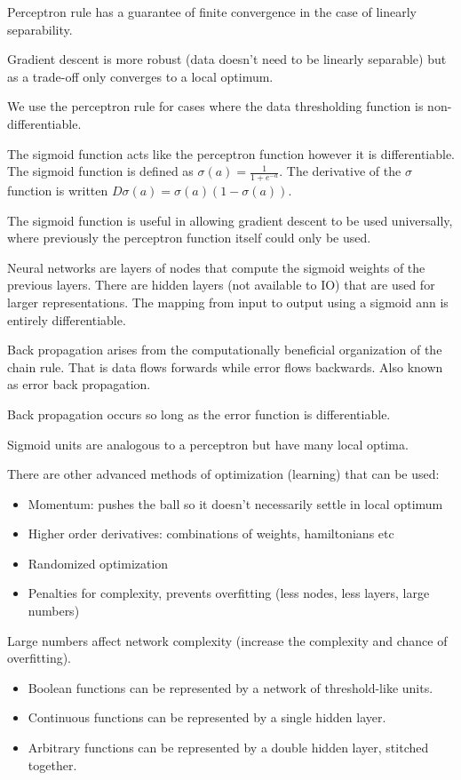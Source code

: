 \documentclass{article}
\begin{document}
Perceptron rule has a guarantee of finite convergence in the case of linearly 
separability. 

Gradient descent is more robust (data doesn't need to be linearly separable) but
as a trade-off only converges to a local optimum. 

We use the perceptron rule for cases where the data thresholding function is
non-differentiable.

The sigmoid function acts like the perceptron function however it is
differentiable. The sigmoid function is defined as $\sigma(a) = 
\frac{1}{1 + e^{-a}}$. The derivative of the $\sigma$ function is written
$D\sigma(a) = \sigma(a)(1 - \sigma(a))$. 

The sigmoid function is useful in allowing gradient descent to be used
universally, where previously the perceptron function itself could only be used. 

Neural networks are layers of nodes that compute the sigmoid weights of the
previous layers. There are hidden layers (not available to IO) that are used 
for larger representations.  The mapping from input to output using a sigmoid
ann is entirely differentiable. 

Back propagation arises from the computationally beneficial organization of the
chain rule. That is data flows forwards while error flows backwards. Also known
as error back propagation. 

Back propagation occurs so long as the error function is differentiable. 

Sigmoid units are analogous to a perceptron but have many local optima. 

There are other advanced methods of optimization (learning) that can be used:
\begin{itemize}
\item Momentum: pushes the ball so it doesn't necessarily settle in local
	optimum
\item Higher order derivatives: combinations of weights, hamiltonians etc
\item Randomized optimization
\item Penalties for complexity, prevents overfitting (less nodes, less layers,
	large numbers)
\end{itemize}

Large numbers affect network complexity (increase the complexity and chance of
overfitting).

\begin{itemize}
	\item Boolean functions can be represented by a network of 
		threshold-like units.
	\item Continuous functions can be represented by a single hidden layer.
	\item Arbitrary functions can be represented by a double hidden layer, 
		stitched together. 
\end{itemize}
\end{document}
